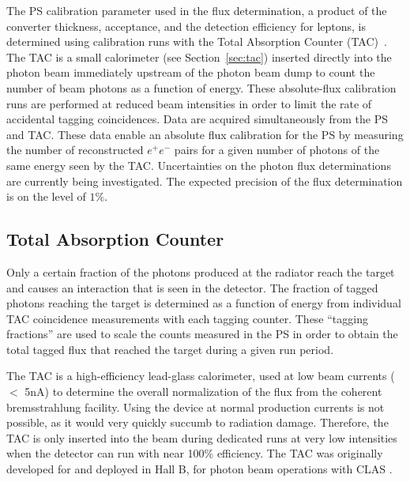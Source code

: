 The PS calibration parameter used in the flux determination, a product
of the  converter thickness, acceptance, and the detection efficiency
for leptons, is determined using calibration runs with the Total 
Absorption Counter (TAC)~\cite{somov_flux}. The TAC is a small calorimeter
(see Section~\ref{sec:tac}) inserted directly into the photon
beam immediately upstream of the photon beam dump to count the number of beam photons as a function of energy.
These absolute-flux calibration runs are performed at reduced beam intensities in
order to limit the rate of accidental tagging coincidences.
Data are acquired simultaneously from the PS and TAC.
These data enable an absolute flux calibration for the PS
by measuring the number of reconstructed $e^+e^-$ pairs for a given
number of photons of the same energy seen by the TAC. 
Uncertainties on the photon flux determinations are currently being
investigated. The expected precision of the flux determination is on
the level of $1\%$.

\subsection{Total Absorption Counter \label{sec:tac}}
Only a certain fraction of the photons produced at the radiator reach the target and causes an interaction that is seen in the \gx{} detector.
The fraction of tagged photons reaching the \gx{} target is determined as a function of energy from individual TAC coincidence measurements with each tagging counter. These ``tagging fractions'' are  used to scale the counts measured in the PS in order to obtain the total tagged flux that reached the \gx{} target during a given run period.

The TAC is a high-efficiency lead-glass calorimeter, used at low beam currents ($<$ 5nA) to determine the overall normalization of the flux from the \gx{} coherent bremsstrahlung facility.  Using the device at normal \gx{} production currents is not possible, as it would very quickly succumb to radiation damage. Therefore, the TAC is only inserted into the beam during dedicated runs at very low intensities when the detector can run with near 100\% efficiency.
The TAC was originally developed for and deployed in Hall B, for photon beam operations with CLAS \cite{clasnote1992014, clasnote1993011,clasnote1999002}.




